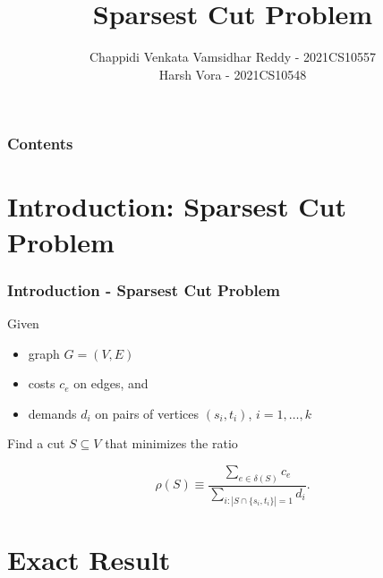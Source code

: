\documentclass{beamer}
\title{Sparsest Cut Problem} %
\author[Chappidi Venkata Vamsidhar Reddy, Harsh Vora]{\texorpdfstring{{\color{red} Chappidi Venkata Vamsidhar Reddy - 2021CS10557 \\Harsh Vora - 2021CS10548}}{Author}}
\institute[IIT Delhi] %
{

\medskip
{\large COL754 Project Presentation}\\
}
\date{} %
\newcounter{cont}
\begin{document}
\begin{frame}
\titlepage %
\end{frame}
\begin{frame}
  \frametitle{Contents}
 \tableofcontents
\end{frame}








\section{Introduction: Sparsest Cut Problem} 
\begin{frame}[allowframebreaks]
\frametitle{Introduction - Sparsest Cut Problem}

    Given
    \begin{itemize}
        \item graph $G = (V, E)$
        \item costs $c_e$ on edges, and
        \item demands $d_i$ on pairs of vertices $(s_i, t_i)$, $i = 1, \dots, k$
    \end{itemize}
    \vspace{0.8cm}
    Find a cut $S \subseteq V$ that minimizes the ratio
    \begin{center}
        \[
        \rho(S) \equiv \frac{\sum \limits_{e \in \delta(S)} c_e}{\sum \limits_{i : |S \cap \{s_i, t_i\}| = 1} d_i}.
        \]
    \end{center}
\end{frame}

\section{Exact Result}
\end{document}
